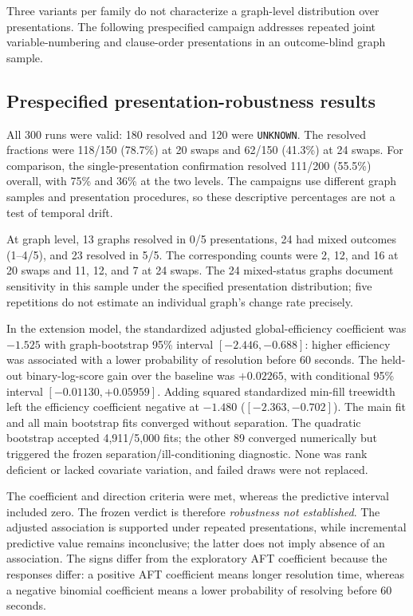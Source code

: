\documentclass[11pt]{article}
\begin{document}
Three variants per family do not characterize a graph-level distribution over presentations. The following prespecified campaign addresses repeated joint variable-numbering and clause-order presentations in an outcome-blind graph sample.

\subsection{Prespecified presentation-robustness results}
\label{sec:robustness}

All 300 runs were valid: 180 resolved and 120 were \texttt{UNKNOWN}. The resolved fractions were 118/150 (78.7\%) at 20 swaps and 62/150 (41.3\%) at 24 swaps. For comparison, the single-presentation confirmation resolved 111/200 (55.5\%) overall, with 75\% and 36\% at the two levels. The campaigns use different graph samples and presentation procedures, so these descriptive percentages are not a test of temporal drift.

At graph level, 13 graphs resolved in 0/5 presentations, 24 had mixed outcomes (1--4/5), and 23 resolved in 5/5. The corresponding counts were 2, 12, and 16 at 20 swaps and 11, 12, and 7 at 24 swaps. The 24 mixed-status graphs document sensitivity in this sample under the specified presentation distribution; five repetitions do not estimate an individual graph's change rate precisely.

In the extension model, the standardized adjusted global-efficiency coefficient was $-1.525$ with graph-bootstrap 95\% interval $[-2.446,-0.688]$: higher efficiency was associated with a lower probability of resolution before 60 seconds. The held-out binary-log-score gain over the baseline was $+0.02265$, with conditional 95\% interval $[-0.01130,+0.05959]$. Adding squared standardized min-fill treewidth left the efficiency coefficient negative at $-1.480$ ($[-2.363,-0.702]$). The main fit and all main bootstrap fits converged without separation. The quadratic bootstrap accepted 4,911/5,000 fits; the other 89 converged numerically but triggered the frozen separation/ill-conditioning diagnostic. None was rank deficient or lacked covariate variation, and failed draws were not replaced.

The coefficient and direction criteria were met, whereas the predictive interval included zero. The frozen verdict is therefore \emph{robustness not established}. The adjusted association is supported under repeated presentations, while incremental predictive value remains inconclusive; the latter does not imply absence of an association. The signs differ from the exploratory AFT coefficient because the responses differ: a positive AFT coefficient means longer resolution time, whereas a negative binomial coefficient means a lower probability of resolving before 60 seconds.
\end{document}
